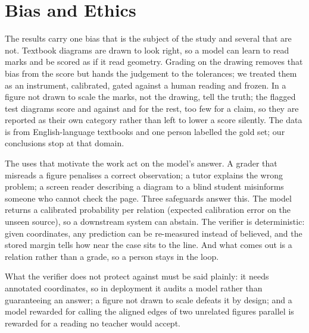 \section{Bias and Ethics}
\label{sec:ethics}

The results carry one bias that is the subject of the study and several that are not. Textbook diagrams are drawn to look right, so a model can learn to read marks and be scored as if it read geometry. Grading on the drawing removes that bias from the score but hands the judgement to the tolerances; we treated them as an instrument, calibrated, gated against a human reading and frozen. In a figure not drawn to scale the marks, not the drawing, tell the truth; the \nNtsTestDiagrams{} flagged test diagrams score \fNtsNotToScaleId{} and \fNtsNotToScaleHo{} against \fNtsToScaleId{} and \fNtsToScaleHo{} for the rest, too few for a claim, so they are reported as their own category rather than left to lower a score silently. The data is from English-language textbooks and one person labelled the gold set; our conclusions stop at that domain.

The uses that motivate the work act on the model's answer. A grader that misreads a figure penalises a correct observation; a tutor explains the wrong problem; a screen reader describing a diagram to a blind student misinforms someone who cannot check the page. Three safeguards answer this. The model returns a calibrated probability per relation (expected calibration error \cite{guo2017calibration} \eceFtHo{} on the unseen source), so a downstream system can abstain. The verifier is deterministic: given coordinates, any prediction can be re-measured instead of believed, and the stored margin tells how near the case sits to the line. And what comes out is a relation rather than a grade, so a person stays in the loop.

What the verifier does not protect against must be said plainly: it needs annotated coordinates, so in deployment it audits a model rather than guaranteeing an answer; a figure not drawn to scale defeats it by design; and a model rewarded for calling the aligned edges of two unrelated figures parallel is rewarded for a reading no teacher would accept.
